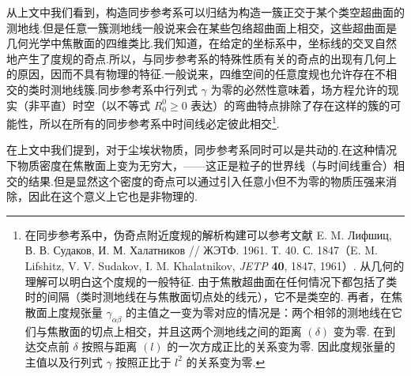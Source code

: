 从上文中我们看到，构造同步参考系可以归结为构造一簇正交于某个类空超曲面的测地线.但是任意一簇测地线一般说来会在某些包络超曲面上相交，这些超曲面是几何光学中焦散面的四维类比.我们知道，在给定的坐标系中，坐标线的交叉自然地产生了度规的奇点.所以，与同步参考系的特殊性质有关的奇点的出现有几何上的原因，因而不具有物理的特征.一般说来，四维空间的任意度规也允许存在不相交的类时测地线簇.同步参考系中行列式 $\gamma$ 为零的必然性意味着，场方程允许的现实（非平直）时空（以不等式 $R^0_0\geqslant0$ 表达）的弯曲特点排除了存在这样的簇的可能性，所以在所有的同步参考系中时间线必定彼此相交\footnote{在同步参考系中，伪奇点附近度规的解析构建可以参考文献 E. M. Лифшиц, В. В. Судаков, И. М. Халатников // ЖЭТФ. 1961. Т. 40. С. 1847（E. M. Lifshitz, V. V. Sudakov, I. M. Khalatnikov, \textit{JETP} \textbf{40}, 1847, 1961）. 从几何的理解可以明白这个度规的一般特征. 由于焦散超曲面在任何情况下都包括了类时的间隔（类时测地线在与焦散面切点处的线元），它不是类空的. 再者，在焦散面上度规张量 $\gamma_{\alpha\beta}$ 的主值之一变为零对应的情况是：两个相邻的测地线在它们与焦散面的切点上相交，并且这两个测地线之间的距离 $(\delta)$ 变为零. 在到达交点前 $\delta$ 按照与距离 $(l)$ 的一次方成正比的关系变为零. 因此度规张量的主值以及行列式 $\gamma$ 按照正比于 $l^2$ 的关系变为零.}.

在上文中我们提到，对于尘埃状物质，同步参考系同时可以是共动的.在这种情况下物质密度在焦散面上变为无穷大，——这正是粒子的世界线（与时间线重合）相交的结果.但是显然这个密度的奇点可以通过引入任意小但不为零的物质压强来消除，因此在这个意义上它也是非物理的.

